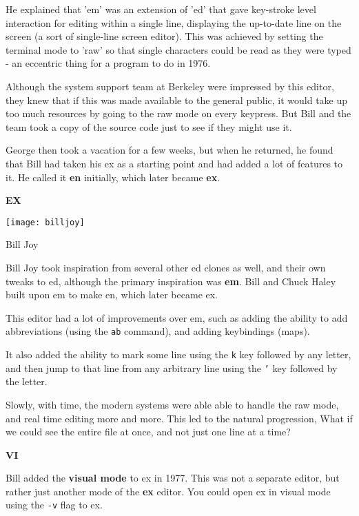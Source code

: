 He explained that 'em' was an extension of 'ed'
that gave key-stroke level interaction for editing
within a single line, displaying the up-to-date line
on the screen (a sort of single-line screen editor).
This was achieved by setting the terminal mode to 'raw'
so that single characters could be read as they were typed
- an eccentric thing for a program to do in 1976.

Although the system support team at Berkeley were
impressed by this editor, they knew that if this
was made available to the general public, it would
take up too much resources by going to the raw mode
on every keypress.
But Bill and the team took a copy of the source code
just to see if they might use it.

George then took a vacation for a few weeks,
but when he returned, he found that Bill had
taken his ex as a starting point and had
added a lot of features to it. He called it
\textbf{en} initially, which later became \textbf{ex}.

\textbf{EX}

\begin{marginfigure}
  \texttt{[image: billjoy]}
  \caption{Bill Joy}
\end{marginfigure}


Bill Joy took inspiration from several other ed clones as well,
and their own tweaks to ed,
although the primary inspiration was \textbf{em}.
Bill and Chuck Haley built upon em to make en, which later became ex.

This editor had a lot of improvements over em,
such as adding the ability to add abbreviations
(using the \texttt{ab} command),
and adding keybindings (maps).

It also added the ability to mark some line
using the \texttt{k} key followed by any letter,
and then jump to that line from any arbitrary line
using the \texttt{'} key followed by the letter.

Slowly, with time, the modern systems were able able
to handle the raw mode, and real time editing more and more.
This led to the natural progression, What if we could
see the entire file at once, and not just one line at a time?

\textbf{VI}

Bill added the \textbf{visual mode} to ex in 1977.
This was not a separate editor, but rather just another mode
of the \textbf{ex} editor.
You could open ex in visual mode using the \texttt{-v} flag to
ex.


